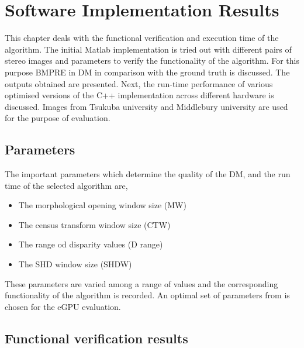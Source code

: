 \chapter{Software Implementation Results}
\label{sec:aresults}

This chapter deals with the functional verification and execution time of the algorithm. The initial Matlab implementation is tried out with different pairs of stereo images and parameters to verify the functionality of the algorithm.  For this purpose BMPRE in DM in comparison with the ground truth is discussed. The outputs obtained are presented. Next, the run-time performance of various optimised versions of the C++ implementation across different hardware is discussed. Images from Tsukuba university \cite{Martull2012,Peris2012} and Middlebury university \cite{Scharstein2001,Scharstein2003} are used for the purpose of evaluation.
%

\section{Parameters}
\label{sec:parameters}

The important parameters which determine the quality of the DM, and the run time of the selected algorithm are, \begin{itemize}
\item{The morphological opening window size (MW)}
\item{The census transform window size (CTW)}
\item{The range od disparity values (D range)}
\item{The SHD window size (SHDW)}
\end{itemize}

These parameters are varied among a range of values and the corresponding functionality of the algorithm is recorded. An optimal set of parameters from is chosen for the eGPU evaluation.

\section{Functional verification results}
\label{sec:fverificationres}


